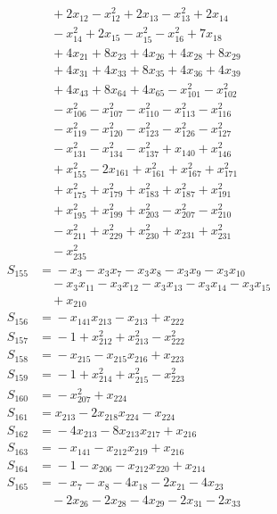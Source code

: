 \begin{align*}
&\quad{} +2x_{12} -x_{12}^{2} +2x_{13} -x_{13}^{2} +2x_{14} \\
&\quad{} -x_{14}^{2} +2x_{15} -x_{15}^{2} -x_{16}^{2} +7x_{18} \\
&\quad{} +4x_{21} +8x_{23} +4x_{26} +4x_{28} +8x_{29} \\
&\quad{} +4x_{31} +4x_{33} +8x_{35} +4x_{36} +4x_{39} \\
&\quad{} +4x_{43} +8x_{64} +4x_{65} -x_{101}^{2} -x_{102}^{2} \\
&\quad{} -x_{106}^{2} -x_{107}^{2} -x_{110}^{2} -x_{113}^{2} -x_{116}^{2} \\
&\quad{} -x_{119}^{2} -x_{120}^{2} -x_{123}^{2} -x_{126}^{2} -x_{127}^{2} \\
&\quad{} -x_{131}^{2} -x_{134}^{2} -x_{137}^{2} +x_{140} +x_{146}^{2} \\
&\quad{} +x_{155}^{2} -2x_{161} +x_{161}^{2} +x_{167}^{2} +x_{171}^{2} \\
&\quad{} +x_{175}^{2} +x_{179}^{2} +x_{183}^{2} +x_{187}^{2} +x_{191}^{2} \\
&\quad{} +x_{195}^{2} +x_{199}^{2} +x_{203}^{2} -x_{207}^{2} -x_{210}^{2} \\
&\quad{} -x_{211}^{2} +x_{229}^{2} +x_{230}^{2} +x_{231} +x_{231}^{2} \\
&\quad{} -x_{235}^{2} \\
S_{155} &={} -x_{3} -x_{3}x_{7} -x_{3}x_{8} -x_{3}x_{9} -x_{3}x_{10} \\
&\quad{} -x_{3}x_{11} -x_{3}x_{12} -x_{3}x_{13} -x_{3}x_{14} -x_{3}x_{15} \\
&\quad{} +x_{210} \\
S_{156} &={} -x_{141}x_{213} -x_{213} +x_{222} \\
S_{157} &={} -1 +x_{212}^{2} +x_{213}^{2} -x_{222}^{2} \\
S_{158} &={} -x_{215} -x_{215}x_{216} +x_{223} \\
S_{159} &={} -1 +x_{214}^{2} +x_{215}^{2} -x_{223}^{2} \\
S_{160} &={} -x_{207}^{2} +x_{224} \\
S_{161} &={} x_{213} -2x_{218}x_{224} -x_{224} \\
S_{162} &={} -4x_{213} -8x_{213}x_{217} +x_{216} \\
S_{163} &={} -x_{141} -x_{212}x_{219} +x_{216} \\
S_{164} &={} -1 -x_{206} -x_{212}x_{220} +x_{214} \\
S_{165} &={} -x_{7} -x_{8} -4x_{18} -2x_{21} -4x_{23} \\
&\quad{} -2x_{26} -2x_{28} -4x_{29} -2x_{31} -2x_{33} \\

\end{align*}
